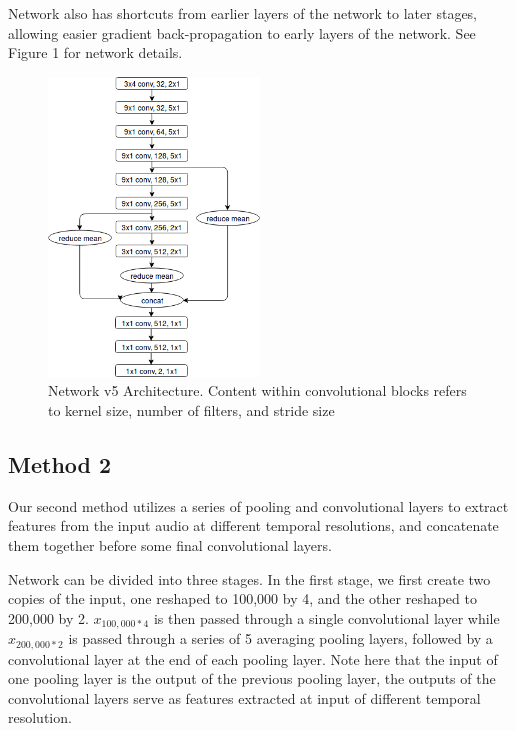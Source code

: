 \documentclass[10pt,twocolumn,letterpaper]{article}
\begin{document}
Network also has shortcuts from earlier layers of the network to later
stages, allowing easier gradient back-propagation to early layers of the
network. See Figure 1 for network details.

\begin{figure}[t]
	\centering
	\includegraphics[width=0.5\textwidth]{v5_diagram}
	\caption{Network v5 Architecture. Content within convolutional blocks
	refers to kernel size, number of filters, and stride size}
\end{figure}


\subsection{Method 2}

Our second method utilizes a series of pooling and convolutional layers to
extract features from the input audio at different temporal resolutions,
and concatenate them together before some final convolutional layers.

Network can be divided into three stages. In the first stage, we first
create two copies of the input, one reshaped to 100,000 by 4, and the other
reshaped to 200,000 by 2. \(x_{100,000*4}\) is then passed through a single
convolutional layer while \(x_{200,000*2}\) is passed through a series of 5
averaging pooling layers, followed by a convolutional layer at the end of
each pooling layer. Note here that the input of one pooling layer is the
output of the previous pooling layer, the outputs of the convolutional
layers serve as features extracted at input of different temporal
resolution.
\end{document}
